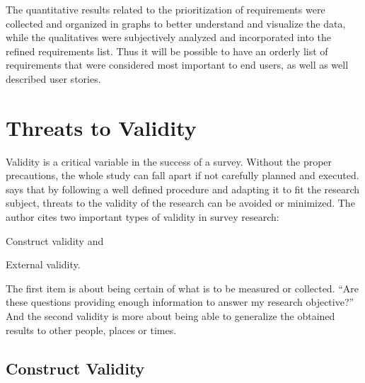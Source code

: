 The quantitative results related to the prioritization of requirements were collected and organized in graphs to better understand and visualize the data, while the qualitatives were subjectively analyzed and incorporated into the refined requirements list. Thus it will be possible to have an orderly list of requirements that were considered most important to end users, as well as well described user stories.

\section{Threats to Validity}\label{sec:survey-validity}

Validity is a critical variable in the success of a survey. Without the proper precautions, the whole study can fall apart if not carefully planned and executed. \textcite{kasunic2005designing} says that by following a well defined procedure and adapting it to fit the research subject, threats to the validity of the research can be avoided or minimized. The author cites two important types of validity in survey research:
\begin{inparaenum}[(1)]
  \item Construct validity and
  \item External validity.
\end{inparaenum}

The first item is about being certain of what is to be measured or collected. ``Are these questions providing enough information to answer my research objective?'' And the second validity is more about being able to generalize the obtained results to other people, places or times.

\subsection{Construct Validity}\label{sec:survey-construct-validity}

